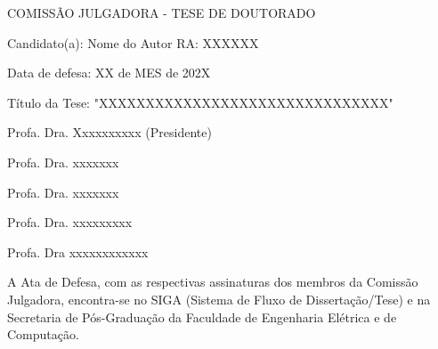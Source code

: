 \documentclass[
    12pt,                %
    oneside,            %
    a4paper,            %
    english,            %
    french,                %
    spanish,            %
    brazil                %
    ]{abntex2}
\begin{document}
    
    
    


% 
%

%
% 
%
\begin{folhadeaprovacao}

  \begin{center}
    COMISS\~{A}O JULGADORA - TESE DE DOUTORADO
\end{center}
\noindent
\begin{minipage}{\textwidth}\SingleSpacing
Candidato(a): Nome do Autor      RA: XXXXXX

Data de defesa: XX de MES de 202X

T\'{i}tulo da Tese: "XXXXXXXXXXXXXXXXXXXXXXXXXXXXXXX"
\vspace{2cm}

Profa. Dra. Xxxxxxxxxx (Presidente)

Profa. Dra. xxxxxxx

Profa. Dra. xxxxxxx

Profa. Dra. xxxxxxxxx

Profa. Dra xxxxxxxxxxxx

\vspace{2cm}

A Ata de Defesa, com as respectivas assinaturas dos membros da Comissão Julgadora, encontra-se no SIGA (Sistema de Fluxo de Dissertação/Tese) e na Secretaria de Pós-Graduação da Faculdade de Engenharia Elétrica e de Computação.
\end{minipage}

\end{folhadeaprovacao}
\end{document}
